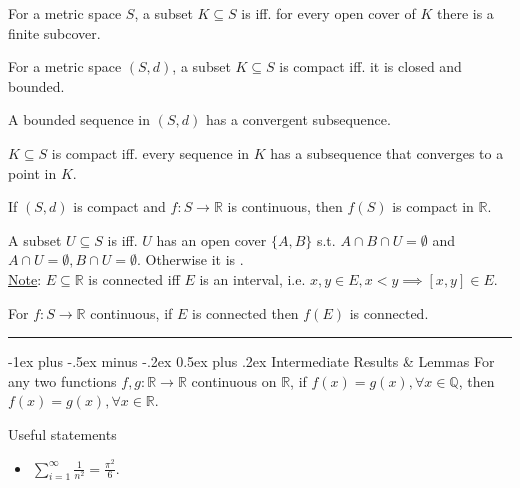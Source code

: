 \documentclass[10pt,landscape,letterpaper]{article}
\makeatletter
\renewcommand{\section}{\@startsection{section}{1}{0mm}%
                                {-1ex plus -.5ex minus -.2ex}%
                                {0.5ex plus .2ex}%
                                {\sffamily\large}}
\makeatother
\begin{document}
\begin{multicols}{3}
For a metric space $S$, a subset $K \subseteq S$ is  iff. for every open cover of $K$ there is a finite subcover.


 For a metric space $(S, d)$, a subset $K \subseteq S$ is compact iff. it is closed and bounded.

 A bounded sequence in $(S, d)$ has a convergent subsequence.

 $K \subseteq S$ is compact iff. every sequence in $K$ has a subsequence that converges to a point in $K$.


 If $(S, d)$ is compact and $f: S \to \mathbb{R}$ is continuous, then $f(S)$ is compact in $\mathbb{R}$.


\smallbreak


A subset $U \subseteq S$ is  iff. $U$ has an open cover $\{ A, B\}$ s.t. $A \cap B \cap U = \emptyset$ and $A \cap U = \emptyset, B \cap U = \emptyset$. Otherwise it is .
\\
\underline{Note}: $E \subseteq \mathbb{R}$ is connected iff $E$ is an interval, i.e. $x, y \in E, x < y \implies [x, y] \in E$.


 For $f: S \to \mathbb{R}$ continuous, if $E$ is connected then $f(E)$ is connected.



\noindent\rule{8cm}{0.4pt}




\section{Intermediate Results \& Lemmas}
 For any two functions $f, g: \mathbb{R} \to \mathbb{R}$ continuous on $\mathbb{R}$, if $f(x) = g(x), \forall x \in \mathbb{Q}$, then $f(x) = g(x), \forall x \in \mathbb{R}$.


Useful statements
\begin{itemize}
    \item $\sum_{i=1}^\infty \frac{1}{n^2} = \frac{\pi^2}{6}$.
\end{itemize}


\end{multicols}
\end{document}
